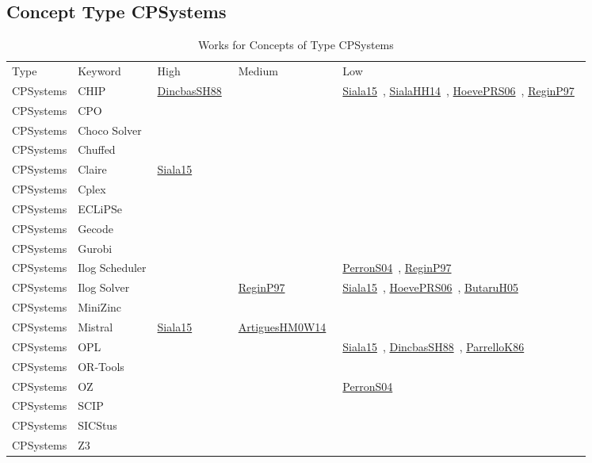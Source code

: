 \clearpage
\subsection{Concept Type CPSystems}
\label{sec:CPSystems}
{\scriptsize
\begin{longtable}{lp{3cm}>{\raggedright\arraybackslash}p{6cm}>{\raggedright\arraybackslash}p{6cm}>{\raggedright\arraybackslash}p{8cm}}
\rowcolor{white}\caption{Works for Concepts of Type CPSystems}\\ \toprule
\rowcolor{white}Type & Keyword & High & Medium & Low\\ \midrule\endhead
\bottomrule
\endfoot
CPSystems & CHIP & \href{cars/works/DincbasSH88.pdf}{DincbasSH88}~\cite{DincbasSH88} &  & \href{cars/works/Siala15.pdf}{Siala15}~\cite{Siala15}, \href{cars/works/SialaHH14.pdf}{SialaHH14}~\cite{SialaHH14}, \href{cars/works/HoevePRS06.pdf}{HoevePRS06}~\cite{HoevePRS06}, \href{cars/works/ReginP97.pdf}{ReginP97}~\cite{ReginP97}\\
CPSystems & CPO &  &  & \\
CPSystems & Choco Solver &  &  & \\
CPSystems & Chuffed &  &  & \\
CPSystems & Claire & \href{cars/works/Siala15.pdf}{Siala15}~\cite{Siala15} &  & \\
CPSystems & Cplex &  &  & \\
CPSystems & ECLiPSe &  &  & \\
CPSystems & Gecode &  &  & \\
CPSystems & Gurobi &  &  & \\
CPSystems & Ilog Scheduler &  &  & \href{cars/works/PerronS04.pdf}{PerronS04}~\cite{PerronS04}, \href{cars/works/ReginP97.pdf}{ReginP97}~\cite{ReginP97}\\
CPSystems & Ilog Solver &  & \href{cars/works/ReginP97.pdf}{ReginP97}~\cite{ReginP97} & \href{cars/works/Siala15.pdf}{Siala15}~\cite{Siala15}, \href{cars/works/HoevePRS06.pdf}{HoevePRS06}~\cite{HoevePRS06}, \href{cars/works/ButaruH05.pdf}{ButaruH05}~\cite{ButaruH05}\\
CPSystems & MiniZinc &  &  & \\
CPSystems & Mistral & \href{cars/works/Siala15.pdf}{Siala15}~\cite{Siala15} & \href{cars/works/ArtiguesHM0W14.pdf}{ArtiguesHM0W14}~\cite{ArtiguesHM0W14} & \\
CPSystems & OPL &  &  & \href{cars/works/Siala15.pdf}{Siala15}~\cite{Siala15}, \href{cars/works/DincbasSH88.pdf}{DincbasSH88}~\cite{DincbasSH88}, \href{cars/works/ParrelloK86.pdf}{ParrelloK86}~\cite{ParrelloK86}\\
CPSystems & OR-Tools &  &  & \\
CPSystems & OZ &  &  & \href{cars/works/PerronS04.pdf}{PerronS04}~\cite{PerronS04}\\
CPSystems & SCIP &  &  & \\
CPSystems & SICStus &  &  & \\
CPSystems & Z3 &  &  & \\
\end{longtable}
}

